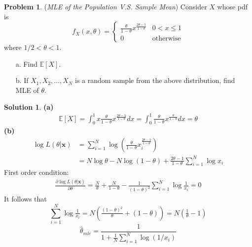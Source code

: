 \documentclass[a4paper, 10pt]{article}
\theoremstyle{definition}
\newtheorem{problem}{Problem}
\theoremstyle{hSol}
\newtheorem*{solution}{Solution}
\begin{document}
\begin{problem} (\textit{MLE of the Population V.S. Sample Mean}) Consider $X$ whose pdf is
$$
f_{X}(x, \theta) = \begin{cases}\frac{\theta}{1-\theta} x^{\frac{2\theta-1}{1-\theta}} & 0<x\leq 1\\
0 & \text{otherwise}
\end{cases}
$$
where $1/2 < \theta <1$.
\begin{itemize}
  \item[a.] Find $\mathbb{E}\left[X\right]$.
  \item[b.] If $X_1, X_2, ..., X_N$ is a random sample from the above distribution, find MLE of $\theta$.
\end{itemize}
\end{problem}
\begin{solution} \textbf{(a)}
\begin{equation}
  \begin{split}
    \mathbb{E}\left[X\right] = \int_0^1 x \frac{\theta}{1-\theta} x^{\frac{2\theta-1}{1-\theta}}dx = \int_0^1  \frac{\theta}{1-\theta} x^{\frac{\theta}{1-\theta}}dx = \theta
  \end{split}
\end{equation}
\textbf{(b)}
\begin{equation}
  \begin{split}
    \log L(\theta |\bm{x}) &= \sum_{i=1}^N \log \left(\frac{\theta}{1-\theta}x_i^{\frac{2\theta-1}{1-\theta}}\right)\\
    &= N\log \theta -  N\log (1-\theta) +  \frac{2\theta-1}{1-\theta}\sum_{i=1}^N\log x_i
  \end{split}
\end{equation}
First order condition:
\begin{equation}
  \begin{split}
    \frac{\partial \log L(\theta| \bm{x})}{\partial \theta} = \frac{N}{\theta} + \frac{N}{1-\theta} - \frac{1}{(1-\theta)^2} \sum_{i=1}^N \log \frac{1}{x_i} = 0
  \end{split}
\end{equation}
It follows that
\begin{equation}
  \sum_{i=1}^N \log \tfrac{1}{x_i} = N\left(\tfrac{(1-\theta)^2}{\theta}+(1-\theta)\right) = N(\tfrac{1}{\theta}-1)
\end{equation}
$$
\hat{\theta}_{mle} = \frac{1}{1+\frac{1}{N}\sum_{i=1}^N \log (1/x_i)}
$$
\end{solution}
\end{document}
